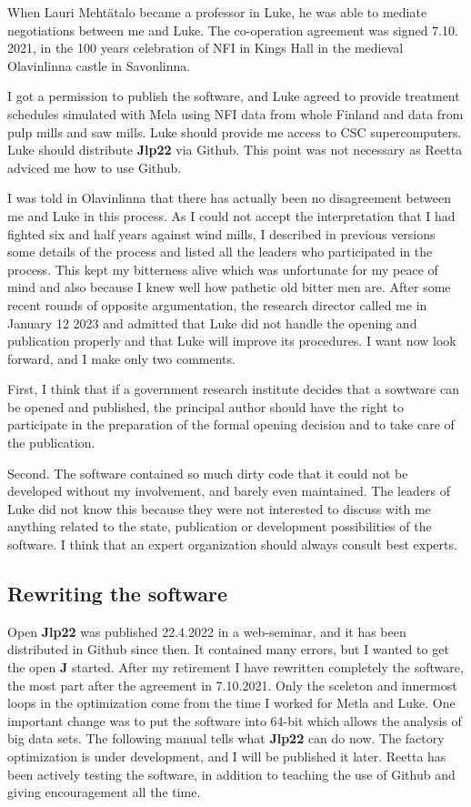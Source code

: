 When Lauri Mehtätalo became a professor in Luke, he was able to mediate negotiations between me and Luke. 
The co-operation agreement was signed 7.10. 2021, in the 100 years celebration of NFI in  Kings Hall 
in the medieval Olavinlinna castle in Savonlinna. 
 
I got a 
permission to publish the software, and Luke agreed to 
provide  treatment schedules simulated with Mela using NFI data from whole Finland and data 
from pulp mills and saw mills. 
Luke should provide me access to CSC supercomputers.  Luke should distribute \textbf{Jlp22} via Github.  This point 
was not necessary as Reetta adviced me how to use Github. 
 
I was told in Olavinlinna that there has actually been no disagreement 
between me and Luke in this process. 
As I could not accept the interpretation that I had fighted six and half years against wind mills, 
I described in previous versions some details of the process and listed all the 
leaders who participated in the process. This kept my bitterness 
alive which was unfortunate for my peace of mind and also because 
I knew well how pathetic old bitter men are. After some recent rounds of opposite argumentation, the research director 
called me in January 12 2023 and admitted that Luke did not handle the opening and publication properly 
and that Luke will improve its procedures. I want now look forward, and I make 
only two comments. 
 
First, I think that if a government research institute decides that a sowtware can be 
opened and published, the principal author should have the right to participate in the 
preparation of the formal opening decision and to take care of the publication. 
 
Second. 
The software contained so much dirty code that it could not be developed without my involvement, 
and barely even maintained. The leaders of Luke did not know this because they were not 
interested to discuss with me anything related to the state, publication or 
development possibilities of the software. I think that an expert organization should 
always consult best experts. 
 
 
\subsection*{Rewriting the software} 
 
Open \textbf{Jlp22} was published 22.4.2022 in a web-seminar, and it has been distributed in Github since then. 
It contained many errors, but I wanted to get the open \textbf{J} started. 
After my retirement I have rewritten completely the software, 
the most part after the agreement in 7.10.2021. 
Only the sceleton and innermost loops in the optimization come from the time I worked 
for Metla and Luke. One important change was to put the software into 64-bit which 
allows the analysis of big data sets. The following manual tells what \textbf{Jlp22} can do now. 
The factory optimization is under development, and I will be published it later. 
Reetta has been actively testing the software, 
in addition to teaching the use of Github and giving encouragement all the time. 
 
